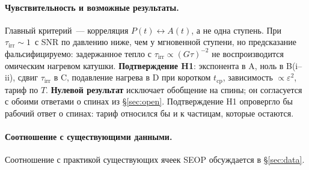 \documentclass[11pt,a4paper]{article}
\newcommand{\Sref}[1]{\hyperref[#1]{\S\ref{#1}}}
\begin{document}
\paragraph{Чувствительность и возможные результаты.}
Главный критерий~--- корреляция $P(t)\leftrightarrow A(t)$, а не одна ступень. При $\tau_{\mathrm{irr}}\sim 1$~с SNR по давлению ниже, чем у мгновенной ступени, но предсказание фальсифицируемо: задержанное тепло с $\tau_{\mathrm{irr}}\propto(G\tau)^{-2}$ не воспроизводится омическим нагревом катушки. \textbf{Подтверждение H1}: экспонента в A, ноль в B(i--ii), сдвиг $\tau_{\mathrm{irr}}$ в C, подавление нагрева в D при коротком $t_{\mathrm{cp}}$, зависимость $\propto\varepsilon^2$, тариф по $T$. \textbf{Нулевой результат} исключает обобщение на спины; он согласуется с обоими ответами о спинах из \Sref{sec:open}. Подтверждение H1 опровергло бы рабочий ответ о спинах: тариф относился бы и к частицам, которые остаются.
\paragraph{Соотношение с существующими данными.}
Соотношение с практикой существующих ячеек SEOP обсуждается в \Sref{sec:data}.
\end{document}
